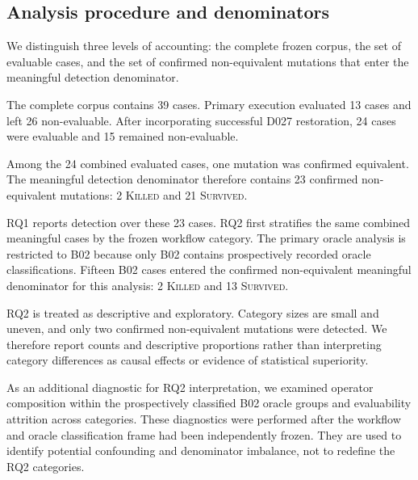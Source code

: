 \subsection{Analysis procedure and denominators}
\label{sec:analysis-denominators}

We distinguish three levels of accounting: the complete frozen corpus, the set
of evaluable cases, and the set of confirmed non-equivalent mutations that
enter the meaningful detection denominator.

The complete corpus contains 39 cases. Primary execution evaluated 13 cases
and left 26 non-evaluable. After incorporating successful D027 restoration, 24
cases were evaluable and 15 remained non-evaluable.

Among the 24 combined evaluated cases, one mutation was confirmed equivalent.
The meaningful detection denominator therefore contains 23 confirmed
non-equivalent mutations: 2 \textsc{Killed} and 21 \textsc{Survived}.

RQ1 reports detection over these 23 cases. RQ2 first stratifies the same
combined meaningful cases by the frozen workflow category. The primary oracle
analysis is restricted to B02 because only B02 contains prospectively recorded
oracle classifications. Fifteen B02 cases entered the confirmed
non-equivalent meaningful denominator for this analysis: 2 \textsc{Killed}
and 13 \textsc{Survived}.

RQ2 is treated as descriptive and exploratory. Category sizes are small and
uneven, and only two confirmed non-equivalent mutations were detected. We
therefore report counts and descriptive proportions rather than interpreting
category differences as causal effects or evidence of statistical superiority.

As an additional diagnostic for RQ2 interpretation, we examined operator
composition within the prospectively classified B02 oracle groups and
evaluability attrition across categories. These diagnostics were performed
after the workflow and oracle classification frame had been independently
frozen. They are used to identify potential confounding and denominator
imbalance, not to redefine the RQ2 categories.
